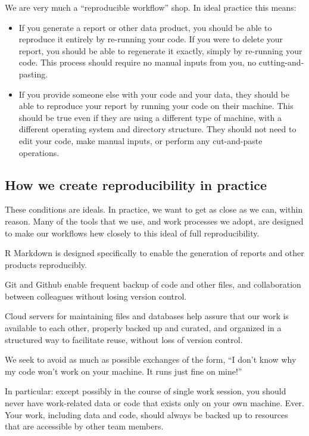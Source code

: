 \documentclass[
]{book}
\begin{document}
We are very much a ``reproducible workflow'' shop. In ideal practice this means:

\begin{itemize}
\item
  If you generate a report or other data product, you should be able to reproduce it entirely by re-running your code. If you were to delete your report, you should be able to regenerate it exactly, simply by re-running your code. This process should require no manual inputs from you, no cutting-and-pasting.
\item
  If you provide someone else with your code and your data, they should be able to reproduce your report by running your code on their machine. This should be true even if they are using a different type of machine, with a different operating system and directory structure. They should not need to edit your code, make manual inputs, or perform any cut-and-paste operations.
\end{itemize}

\hypertarget{how-we-create-reproducibility-in-practice}{%
\subsection{How we create reproducibility in practice}\label{how-we-create-reproducibility-in-practice}}

These conditions are ideals. In practice, we want to get as close as we can, within reason. Many of the tools that we use, and work processes we adopt, are designed to make our workflows hew closely to this ideal of full reproducibility.

R Markdown is designed specifically to enable the generation of reports and other products reproducibly.

Git and Github enable frequent backup of code and other files, and collaboration between colleagues without losing version control.

Cloud servers for maintaining files and databases help assure that our work is available to each other, properly backed up and curated, and organized in a structured way to facilitate reuse, without loss of version control.

We seek to avoid as much as possible exchanges of the form, ``I don't know why my code won't work on your machine. It runs just fine on mine!''

In particular: except possibly in the course of single work session, you should never have work-related data or code that exists only on your own machine. Ever. Your work, including data and code, should always be backed up to resources that are accessible by other team members.
\end{document}
